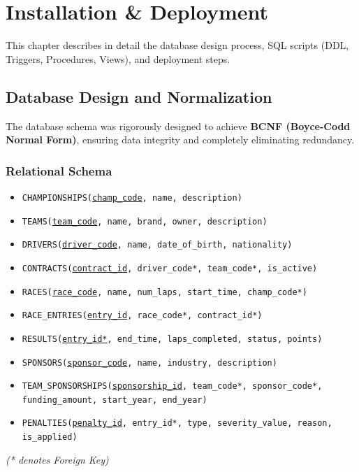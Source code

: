 \documentclass[12pt, a4paper]{report}
\begin{document}
\chapter{Installation \& Deployment}

This chapter describes in detail the database design process, SQL scripts (DDL, Triggers, Procedures, Views), and deployment steps.

\section{Database Design and Normalization}

The database schema was rigorously designed to achieve \textbf{BCNF (Boyce-Codd Normal Form)}, ensuring data integrity and completely eliminating redundancy.


\subsection{Relational Schema}
\begin{itemize}
    \item \texttt{CHAMPIONSHIPS(\underline{champ\_code}, name, description)}
    \item \texttt{TEAMS(\underline{team\_code}, name, brand, owner, description)}
    \item \texttt{DRIVERS(\underline{driver\_code}, name, date\_of\_birth, nationality)}
    \item \texttt{CONTRACTS(\underline{contract\_id}, driver\_code*, team\_code*, is\_active)}
    \item \texttt{RACES(\underline{race\_code}, name, num\_laps, start\_time, champ\_code*)}
    \item \texttt{RACE\_ENTRIES(\underline{entry\_id}, race\_code*, contract\_id*)}
    \item \texttt{RESULTS(\underline{entry\_id*}, end\_time, laps\_completed, status, points)}
    \item \texttt{SPONSORS(\underline{sponsor\_code}, name, industry, description)}
    \item \texttt{TEAM\_SPONSORSHIPS(\underline{sponsorship\_id}, team\_code*, sponsor\_code*, funding\_amount, start\_year, end\_year)}
    \item \texttt{PENALTIES(\underline{penalty\_id}, entry\_id*, type, severity\_value, reason, is\_applied)}
\end{itemize}
\textit{(* denotes Foreign Key)}
\end{document}
